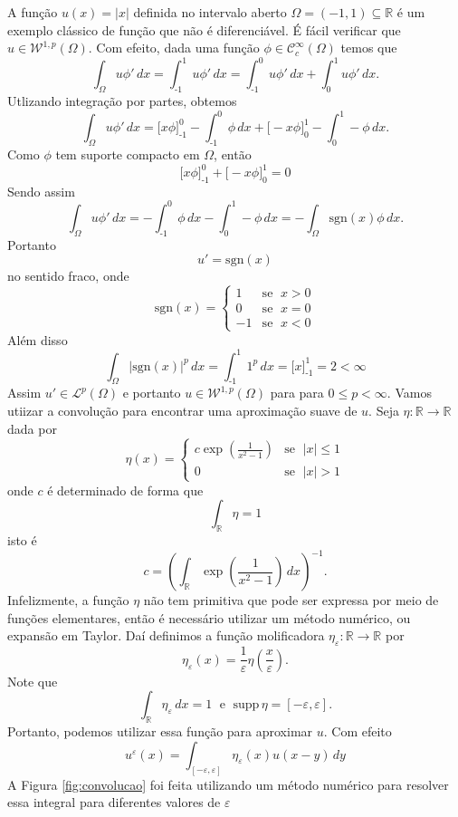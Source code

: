 \documentclass[a4paper, 11pt]{book}
\theoremstyle{definition}
\newcommand{\bR}{\mathbb{R}}
\newcommand{\cC}{\mathcal{C}}
\newcommand{\cL}{\mathcal{L}}
\newcommand{\cW}{\mathcal{W}}
\newcommand{\supp}{\mathrm{supp}\,}
\newcommand{\sgn}{\mathrm{sgn}}
\begin{document}
\begin{ex}
    A função $u(x) = |x|$ definida no intervalo aberto $\Omega = (-1,1) \subseteq \bR$ é um exemplo clássico de função que não é diferenciável. É fácil verificar que $u \in \cW^{1,p}(\Omega)$. Com efeito, dada uma função $\phi \in \cC^\infty_c(\Omega)$ temos que
    \[
        \int_\Omega u \phi' \,dx = \int_{\text{-}1}^1 u \phi' \,dx = \int_{\text{-}1}^0 u \phi' \,dx + \int_0^1 u \phi' \,dx.
    \]
    Utlizando integração por partes, obtemos
    \[
        \int_\Omega u \phi'\,dx = \bigg[ x\phi \bigg]_{\text{-}1}^0 - \int_{\text{-}1}^0 \phi \,dx + \bigg[ -x \phi \bigg]_0^1 - \int_0^1 -\phi \,dx.
    \]
    Como $\phi$ tem suporte compacto em $\Omega$, então
    \[
       \bigg[ x\phi \bigg]_{\text{-}1}^0 + \bigg[ -x \phi \bigg]_0^1 = 0
    \]
    Sendo assim
    \[
        \int_\Omega u \phi'\,dx = - \int_{\text{-}1}^0 \phi \,dx - \int_0^1 -\phi \,dx = -\int_\Omega \sgn(x)\phi \,dx.
    \]
    Portanto
    \[
        u'= \sgn(x)
    \]
    no sentido fraco, onde
    \[
        \sgn(x) = 
        \left\{ 
            \begin{array}{rr}
                1 & \text{se }\; x > 0\\
                0 & \text{se }\; x = 0\\
                -1& \text{se }\; x < 0
            \end{array}
        \right.
    \]
    Além disso
    \[
        \int_\Omega |\sgn(x)|^p \,dx = \int_{\text{-}1}^1 1^p \,dx = \bigg[ x \bigg]^1_{\text{-}1} = 2 < \infty
    \]
    Assim $u'\in \cL^p(\Omega)$ e portanto $u \in \cW^{1,p}(\Omega)$ para para $0 \leqslant p < \infty$.
    Vamos utiizar a convolução para encontrar uma aproximação suave de $u$. 
    Seja $\eta : \bR \to \bR$ dada por
    \[
        \eta(x) = \left\{ 
            \begin{array}{lr}
                c \exp\left(\frac{1}{x^2 - 1} \right) & \text{se }\; |x| \leqslant 1\\
                0 & \text{se }\; |x| > 1
            \end{array}
        \right.
    \]
    onde $c$ é determinado de forma que
    \[
        \int_{\bR} \eta = 1
    \]
    isto é
    \[
        c = \left( \int_\bR \exp \left(\frac{1}{x^2 - 1} \right) \, dx\right)^{-1}.
    \]
    Infelizmente, a função $\eta$ não tem primitiva que pode ser expressa por meio de funções elementares, então é necessário utilizar um método numérico, ou expansão em Taylor.
    Daí definimos a função molificadora $\eta_\varepsilon : \bR \to \bR$ por
    \[
        \eta_\varepsilon(x) = \frac{1}{\varepsilon} \eta\left( \frac{x}{\varepsilon} \right).
    \]
    Note que
    \[
        \int_\bR \eta_\varepsilon \, dx = 1 \;\text{ e }\; \supp \eta = [-\varepsilon,\varepsilon].
    \]
    Portanto, podemos utilizar essa função para aproximar $u$. Com efeito
    \[
        u^\varepsilon(x) = \int_{[-\varepsilon,\varepsilon]} \eta_\varepsilon(x) u(x-y) \,dy
    \]
    A Figura \ref{fig:convolucao} foi feita utilizando um método numérico para resolver essa integral para diferentes valores de $\varepsilon$ 


\end{ex}
\end{document}
